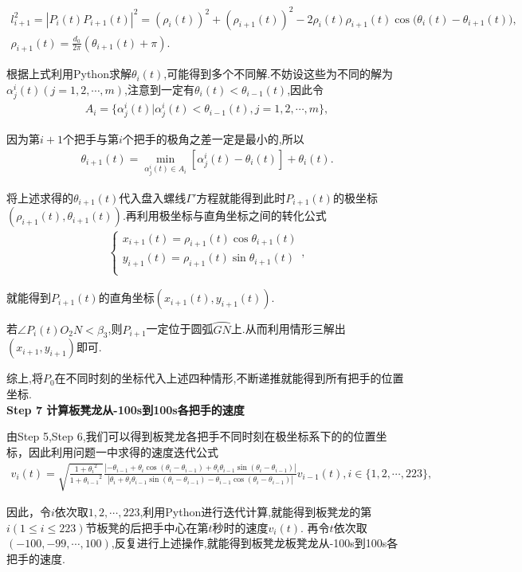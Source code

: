 \documentclass{cumcmthesis}
\begin{document}
    \begin{gather}\label{1.........458}
l_{i+1}^{2}=|P_i(t)P_{i+1}(t)|^2=(\rho _i(t))^2+(\rho _{i+1}(t))^2-2\rho _i(t)\rho _{i+1}(t)\cos\mathrm{(}\theta _i(t)-\theta _{i+1}(t)),
\\
\rho _{i+1}(t)=\frac{d_0}{2\pi}\left( \theta _{i+1}(t)+\pi \right) .
\end{gather}
\par 根据上式利用Python求解\(\theta _{i}(t)\),可能得到多个不同解.不妨设这些为不同的解为\(\alpha _{j}^{i}(t) (j = 1,2,\cdots ,m)\),注意到一定有\(\theta _{i}(t)<\theta _{i-1}(t)\),因此令
\begin{align}\label{1.........459}
A_i = \{ \alpha _{j}^{i}(t) |\alpha _{j}^{i}(t) <\theta _{i-1}(t),j = 1,2,\cdots ,m \},
\end{align}
\par 因为第\(i + 1\)个把手与第$i$个把手的极角之差一定是最小的,所以
\begin{align}\label{1.........460}
\theta _{i+1}(t)=\underset{\alpha _{j}^{i}(t)\in A_i}{\min}\left[ \alpha _{j}^{i}\left( t \right) -\theta _i\left( t \right) \right] +\theta _i\left( t \right) .
\end{align}
\par 将上述求得的\(\theta _{i+1}(t)\)代入盘入螺线$\varGamma'$方程就能得到此时\(P_{i+1}(t)\)的极坐标\((\rho _{i+1}(t),\theta _{i+1}(t))\).再利用极坐标与直角坐标之间的转化公式
\begin{align}\label{1.........461}
\begin{cases}
x_{i+1}(t)=\rho _{i+1}(t)\cos \theta _{i+1}(t)\\
y_{i+1}(t)=\rho _{i+1}(t)\sin \theta _{i+1}(t)\\
\end{cases}, 
\end{align}
\par 就能得到\(P_{i+1}(t)\)的直角坐标\((x_{i+1}(t),y_{i+1}(t))\).

\par 若$\angle P_i(t)O_2N< \beta_3$,则$P_{i+1}$一定位于圆弧$\wideparen{GN}$上.从而利用情形三解出$(x_{i+1},y_{i+1})$即可.

\par 综上,将$P_0$在不同时刻的坐标代入上述四种情形,不断递推就能得到所有把手的位置坐标.
\\\noindent\textbf{Step 7 计算板凳龙从-100s到100s各把手的速度} 
 \par 由Step 5,Step 6,我们可以得到板凳龙各把手不同时刻在极坐标系下的的位置坐标，因此利用问题一中求得的速度迭代公式
 \begin{align}
    v_i(t) = \sqrt{\frac{1 + {\theta _i}^2}{1 + {\theta _{i - 1}}^2}}\frac{|-\theta _{i - 1}+\theta _i\cos(\theta _{i }-\theta _{i-1})+\theta _i\theta _{i - 1}\sin(\theta _{i }-\theta _{i-1})|}{|\theta _i+\theta _i\theta _{i - 1}\sin(\theta _i -\theta _{i-1})-\theta _{i - 1}\cos(\theta _i -\theta _{i-1})|} v_{i - 1}(t), i\in \{1, 2, \cdots, 223\},
    \end{align}
   \par  因此，令\(i\)依次取\(1, 2, \cdots, 223\),利用Python进行迭代计算,就能得到板凳龙的第\(i(1\leqslant i\leqslant 223)\)节板凳的后把手中心在第\(t\)秒时的速度\(v_i(t)\).
再令\(t\)依次取$(-100, -99, \cdots, 100)$,反复进行上述操作,就能得到板凳龙板凳龙从-100s到100s各把手的速度.  
\end{document}
